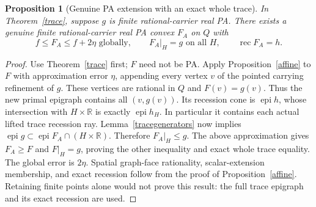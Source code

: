 \documentclass[11pt]{article}
\newtheorem{proposition}[theorem]{Proposition}
\theoremstyle{definition}\newtheorem{definition}[theorem]{Definition}
\theoremstyle{remark}\newtheorem{remark}[theorem]{Remark}
\newcommand{\R}{\mathbb R}\newcommand{\Q}{\mathbb Q}
\newcommand{\epi}{\operatorname{epi}}\newcommand{\conv}{\operatorname{conv}}\newcommand{\cone}{\operatorname{cone}}
\newcommand{\rec}{\operatorname{rec}}\newcommand{\dom}{\operatorname{dom}}
\begin{document}
\begin{proposition}[Genuine PA extension with an exact whole trace]\label{sync}
In Theorem~\ref{trace}, suppose $g$ is finite rational-carrier real PA. There exists a genuine finite rational-carrier real PA convex $F_A$ on $Q$ with
\[
f\leq F_A\leq f+2\eta\text{ globally},\qquad F_A|_H=g\text{ on all }H,\qquad\rec F_A=h.
\]
\end{proposition}
\begin{proof}
Use Theorem~\ref{trace} first; $F$ need not be PA. Apply Proposition~\ref{affine} to $F$ with approximation error $\eta$, appending every vertex $v$ of the pointed carrying refinement of $g$. These vertices are rational in $Q$ and $F(v)=g(v)$. Thus the new primal epigraph contains all $(v,g(v))$. Its recession cone is $\epi h$, whose intersection with $H\times\R$ is exactly $\epi h_H$. In particular it contains each actual lifted trace recession ray. Lemma~\ref{tracegenerators} now implies
$\epi g\subset \epi F_A\cap(H\times\R)$.
Therefore $F_A|_H\leq g$. The above approximation gives $F_A\geq F$ and $F|_H=g$, proving the other inequality and exact whole trace equality. The global error is $2\eta$. Spatial graph-face rationality, scalar-extension membership, and exact recession follow from the proof of Proposition~\ref{affine}. Retaining finite points alone would not prove this result: the full trace epigraph and its exact recession are used.
\end{proof}
\end{document}
